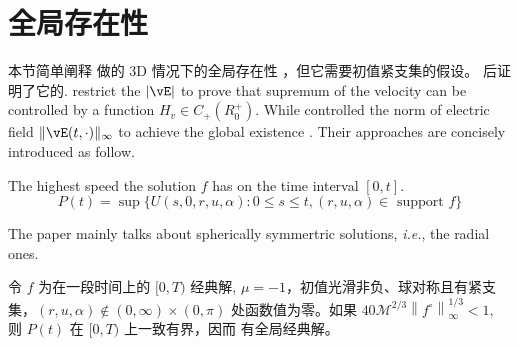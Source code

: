 \section{全局存在性}
本节简单阐释 \cite*{glassey_symmetric_1985} 做的 \eqrvp 3D 情况下的全局存在性  ，但它需要初值紧支集的假设。\cite*{wang2003global} 后证明了它的. \cite*{glassey_symmetric_1985} restrict the $|\vE|$  to prove that supremum of the velocity can be controlled by a function $H_v \in C_{+}(R_0^+)$. While \cite*{wang2003global} controlled the norm of electric field $\|\vE(t, \cdot)\|_{\infty}$ to achieve the global existence . Their approaches are concisely introduced as follow.


    

\begin{definition}
The highest speed the solution $f$ has on the time interval $[0,t]$.
$$
P(t)=\sup \{U(s, 0, r, u, \alpha): 0 \leq s \leq t,(r, u, \alpha) \in \text { support } f\}
$$
\end{definition}
    

The paper mainly talks about spherically symmertric solutions, \textit{i.e.}, the radial ones. 






\begin{theorem}
令 $f$ 为\eqrvp 在一段时间上的 $[0, T)$ 经典解, $\mu=-1$，初值光滑非负、球对称且有紧支集，$(r, u, \alpha) \notin(0, \infty) \times(0, \pi) $ 处函数值为零。如果 $40 \mathcal{M}^{2 / 3}\left\|f^{\circ}\right\|_{\infty}^{1 / 3}<1,$ 则 $P(t)$ 在 $[0, T)$ 上一致有界，因而 \eqrvp 有全局经典解。
\end{theorem}



